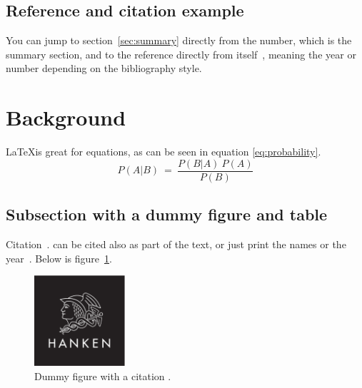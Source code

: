 \documentclass[12pt, a4paper, oneside]{article}
\begin{document}

\blindtext
\blinditemize
\blindtext

\subsection{Reference and citation example} \label{subsec:reference-and-citation-example}

You can jump to section~\ref{sec:summary} directly from the number, which is the summary section,
and to the reference directly from itself~\citep{vet2007ophthal},
meaning the year or number depending on the bibliography style.

\clearpage


\section{Background} \label{sec:background}

\blindtext

\LaTeX is great for equations, as can be seen in equation \ref{eq:probability}.
\begin{equation} \label{eq:probability}
    P(A | B) \ = \ \frac{P(B | A) \ P(A)}{P(B)}
\end{equation}

\subsection{Subsection with a dummy figure and table} \label{subsec:subsection-with-a-dummy-figure-and-table}

Citation~\citep{hermanson2020anatomy, petersen2005advances}.
\citet{petersen2005advances} can be cited also as part of the text,
or just print the names \citeauthor{petersen2005advances} or the year~\citeyear{petersen2005advances}.
Below is figure~\ref{fig:figure}.

\begin{figure}[h]
    \centering
    \includegraphics[width=0.3\textwidth]{hanken_logo_platta}
    \caption[Dummy figure]{Dummy figure with a citation \citep{mellersh2014genetics}.}
    \label{fig:figure}
\end{figure}
\end{document}
